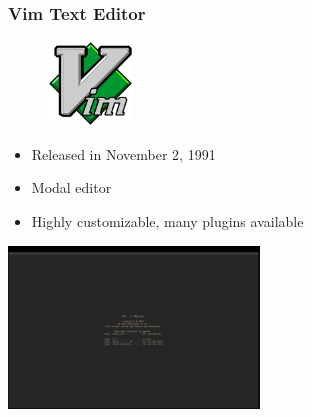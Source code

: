 \documentclass{beamer}
\begin{document}
\begin{frame}
	\frametitle{\textbf{Vim Text Editor}}
		
	\begin{multicols}{2}
		\begin{figure}[h]
			\centering
			\includegraphics[width=0.2\textwidth]{img/Vim_logo.png} 
		\end{figure}

		\begin{itemize}
			\item Released in November 2, 1991
			\item Modal editor 
			\item Highly customizable, many plugins available 
		\end{itemize}

		\includegraphics[width=0.5\textwidth]{img/Vim.png} 
	\end{multicols}
\end{frame}
\end{document}
